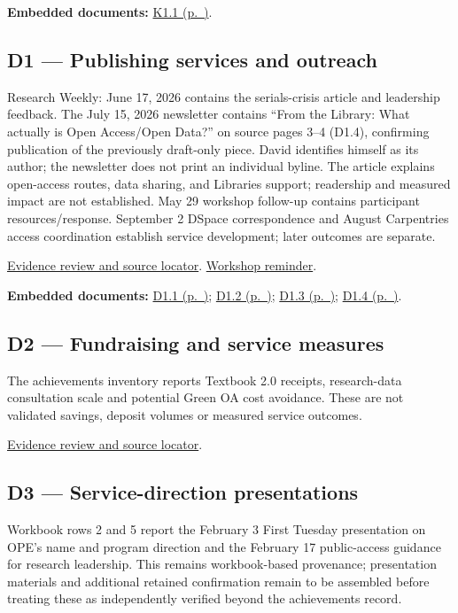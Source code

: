 \par\medskip\noindent\textbf{Embedded documents:} \hyperref[supplement-K1.1]{K1.1 (p.~\pageref{supplement-K1.1})}.

\hypertarget{evidence-D1}{}
\subsection{D1 --- Publishing services and outreach}
Research Weekly: June 17, 2026 contains the serials-crisis article and leadership feedback. The July 15, 2026 newsletter contains ``From the Library: What actually is Open Access/Open Data?'' on source pages 3--4 (D1.4), confirming publication of the previously draft-only piece. David identifies himself as its author; the newsletter does not print an individual byline. The article explains open-access routes, data sharing, and Libraries support; readership and measured impact are not established. May 29 workshop follow-up contains participant resources/response. September 2 DSpace correspondence and August Carpentries access coordination establish service development; later outcomes are separate.

\href{https://github.com/molikd/Molik-Tenure-Document/issues/4#issuecomment-5683209268}{Evidence review and source locator}.
\href{https://github.com/user-attachments/files/32247983/Reminder.and.Instructions.for.ID3A.Data.Curation.for.Grant.Output.Workshop.pdf}{Workshop reminder}.

\par\medskip\noindent\textbf{Embedded documents:} \hyperref[supplement-D1.1]{D1.1 (p.~\pageref{supplement-D1.1})}; \hyperref[supplement-D1.2]{D1.2 (p.~\pageref{supplement-D1.2})}; \hyperref[supplement-D1.3]{D1.3 (p.~\pageref{supplement-D1.3})}; \hyperref[supplement-D1.4]{D1.4 (p.~\pageref{supplement-D1.4})}.

\hypertarget{evidence-D2}{}
\subsection{D2 --- Fundraising and service measures}
The achievements inventory reports Textbook 2.0 receipts, research-data consultation scale and potential Green OA cost avoidance. These are not validated savings, deposit volumes or measured service outcomes.

\href{https://github.com/molikd/Molik-Tenure-Document/issues/4}{Evidence review and source locator}.

\hypertarget{evidence-D3}{}
\subsection{D3 --- Service-direction presentations}
Workbook rows 2 and 5 report the February 3 First Tuesday presentation on OPE's name and program direction and the February 17 public-access guidance for research leadership. This remains workbook-based provenance; presentation materials and additional retained confirmation remain to be assembled before treating these as independently verified beyond the achievements record.

